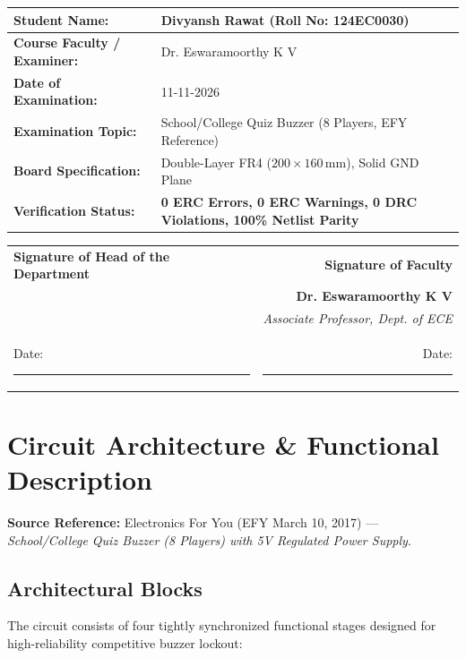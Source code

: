 \documentclass[11pt,a4paper]{article}
\begin{document}
\begin{table}[H]
\centering
\small
\renewcommand{\arraystretch}{1.3}
\begin{tabular}{|l|l|}
\hline
\textbf{Student Name:} & Divyansh Rawat (Roll No: 124EC0030) \\ \hline
\textbf{Course Faculty / Examiner:} & Dr. Eswaramoorthy K V \\ \hline
\textbf{Date of Examination:} & 11-11-2026 \\ \hline
\textbf{Examination Topic:} & School/College Quiz Buzzer (8 Players, EFY Reference) \\ \hline
\textbf{Board Specification:} & Double-Layer FR4 ($200 \times 160$\,mm), Solid GND Plane \\ \hline
\textbf{Verification Status:} & \textbf{0 ERC Errors, 0 ERC Warnings, 0 DRC Violations, 100\% Netlist Parity} \\ \hline
\end{tabular}
\end{table}

\vfill

\noindent
\begin{tabularx}{\textwidth}{X r}
\textbf{Signature of Head of the Department} & \textbf{Signature of Faculty} \\[25pt]
 & \textbf{Dr. Eswaramoorthy K V} \\[4pt]
 & \textit{Associate Professor, Dept. of ECE} \\[6pt]
Date: \rule{4cm}{0.4pt} & Date: \rule{4cm}{0.4pt} \\
\end{tabularx}

\clearpage

\section{Circuit Architecture \& Functional Description}

\textbf{Source Reference:} Electronics For You (EFY March 10, 2017) --- \textit{School/College Quiz Buzzer (8 Players) with 5V Regulated Power Supply}.

\subsection{Architectural Blocks}
The circuit consists of four tightly synchronized functional stages designed for high-reliability competitive buzzer lockout:
\end{document}
